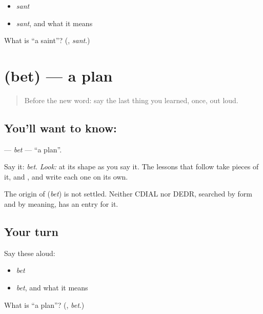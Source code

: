 \begin{itemize}
\raggedright
  \item \emph{sant}
  \item \emph{sant}, and what it means
\end{itemize}

\begin{tcolorbox}[breakable,colback=teal!4,colframe=teal!35!black,title={Before you move on}]
What is \textquotedblleft{}a saint\textquotedblright{}? (\textbf{}, \emph{sant}.)
\end{tcolorbox}
\section[\texorpdfstring{\mr{बेत} (bet)}{बेत (bet)}]{ (bet) — a plan}

\label{lesson:MR-C02-bet}



\begin{quote}
Before the new word: say the last thing you learned, once, out loud.
\end{quote}

\subsection*{You'll want to know: }
\textbf{} — \emph{bet} — \textquotedblleft{}a plan\textquotedblright{}.

Say it: \emph{bet}. \emph{Look:} at its shape as you say it. The lessons that follow take pieces of it, \textbf{} and \textbf{}, and write each one on its own.

\begin{cousinweb}
The origin of \textbf{} (\emph{bet}) is not settled. Neither CDIAL nor DEDR, searched by form and by meaning, has an entry for it.
\end{cousinweb}

\subsection*{Your turn}
Say these aloud:

\begin{itemize}
\raggedright
  \item \emph{bet}
  \item \emph{bet}, and what it means
\end{itemize}

\begin{tcolorbox}[breakable,colback=teal!4,colframe=teal!35!black,title={Before you move on}]
What is \textquotedblleft{}a plan\textquotedblright{}? (\textbf{}, \emph{bet}.)
\end{tcolorbox}
